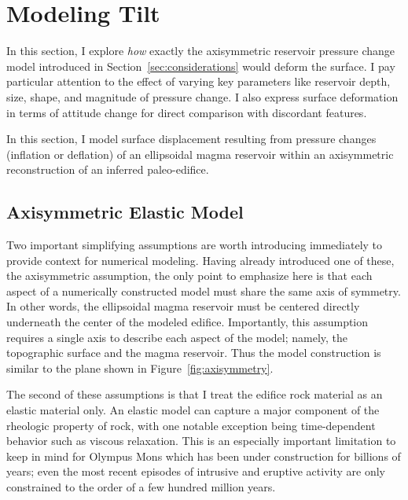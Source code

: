 \section{Modeling Tilt}\label{sec:modeling}

In this section, I explore \emph{how} exactly the axisymmetric reservoir pressure change model introduced in Section~\ref{sec:considerations} would deform the surface. I pay particular attention to the effect of varying key parameters like reservoir depth, size, shape, and magnitude of pressure change. I also express surface deformation in terms of attitude change for direct comparison with discordant features.


In this section, I model surface displacement resulting from pressure changes (inflation or deflation) of an ellipsoidal magma reservoir within an axisymmetric reconstruction of an inferred paleo-edifice.

\subsection{Axisymmetric Elastic Model}

Two important simplifying assumptions are worth introducing immediately to provide context for numerical modeling. Having already introduced one of these, the axisymmetric assumption, the only point to emphasize here is that each aspect of a numerically constructed model must share the same axis of symmetry. In other words, the ellipsoidal magma reservoir must be centered directly underneath the center of the modeled edifice. Importantly, this assumption requires a single axis to describe each aspect of the model; namely, the topographic surface and the magma reservoir. Thus the model construction is similar to the plane shown in Figure~\ref{fig:axisymmetry}.

The second of these assumptions is that I treat the edifice rock material as an elastic material only. An elastic model can capture a major component of the rheologic property of rock, with one notable exception being time-dependent behavior such as viscous relaxation. This is an especially important limitation to keep in mind for Olympus Mons which has been under construction for billions of years; even the most recent episodes of intrusive and eruptive activity are only constrained to the order of a few hundred million years.

